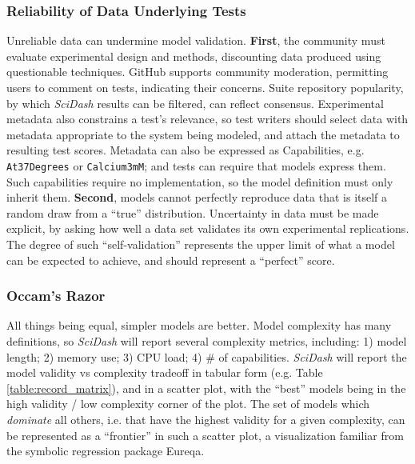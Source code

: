 \documentclass[11pt,letterpaper]{article}
\let\verbx\lstinline
\begin{document}
\subsubsection{Reliability of Data Underlying Tests}
Unreliable data can undermine model validation. 
\textbf{First}, the community must evaluate experimental design and methods, discounting data produced using questionable techniques. 
GitHub supports community moderation, permitting users to comment on tests, indicating their concerns. 
Suite repository popularity, by which \textit{SciDash} results can be filtered, can reflect consensus. 
Experimental metadata also constrains a test's relevance, so test writers should select data with metadata appropriate to the system being modeled, and attach the metadata to resulting test scores. 
Metadata can also be expressed as Capabilities, e.g. \verbx{At37Degrees} or \verbx{Calcium3mM}; and tests can require that models express them. 
Such capabilities require no implementation, so the model definition must only inherit them. 
\textbf{Second}, models cannot perfectly reproduce data that is itself a random draw from a ``true'' distribution. 
Uncertainty in data must be made explicit, by asking how well a data set validates its own experimental replications\cite{kriegeskorte_representational_2008}. 
The degree of such ``self-validation'' represents the upper limit of what a model can be expected to achieve, and should represent a ``perfect'' score.  

\subsubsection{Occam's Razor}
All things being equal, simpler models are better. 
Model complexity has many definitions, so \textit{SciDash} will report several complexity metrics\cite{mccabe_complexity_1976}, including: 
1) model length; 2) memory use; 3) CPU load; 4) \# of capabilities. 
\textit{SciDash} will report the model validity vs complexity tradeoff in tabular form (e.g. Table \ref{table:record_matrix}), and in a scatter plot, with the ``best'' models being in the high validity / low complexity corner of the plot. 
The set of models which \textit{dominate} all others, i.e. that have the highest validity for a given complexity, can be represented as a ``frontier'' in such a scatter plot, a visualization familiar from the symbolic regression package Eureqa\cite{schmidt_distilling_2009}.  
\end{document}
